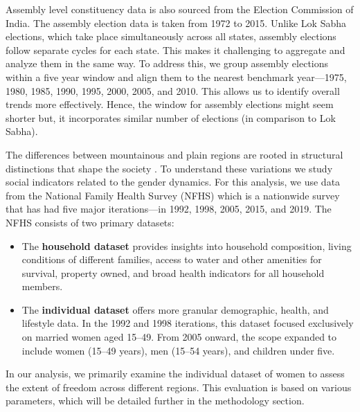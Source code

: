 \vspace{0.3cm}

Assembly level constituency data is also sourced from the Election Commission of India. The assembly election data is taken from 1972 to 2015. Unlike Lok Sabha elections, which take place simultaneously across all states, assembly elections follow separate cycles for each state. This makes it challenging to aggregate and analyze them in the same way. To address this, we group assembly elections within a five year window and align them to the nearest benchmark year—1975, 1980, 1985, 1990, 1995, 2000, 2005, and 2010. This allows us to identify overall trends more effectively. Hence, the window for assembly elections might seem shorter but, it incorporates similar number of elections (in comparison to Lok Sabha).

\vspace{0.3 cm}
\begin{sloppypar}

The differences between mountainous and plain regions  are rooted in  structural distinctions that shape the society \citep{jamesscott}. To  understand these variations we study social indicators related to the gender dynamics. For this analysis, we use data from the National Family Health Survey (NFHS) which is a  nationwide survey that has had five major iterations—in 1992, 1998, 2005, 2015, and 2019. The NFHS consists of two primary datasets: 
\end{sloppypar}
\begin{itemize}
    \item The \textbf{household dataset} provides insights into household composition, living conditions of different families, access to water and other amenities for survival, property owned, and broad health indicators for all household members.
\item The \textbf{individual dataset} offers more granular demographic, health, and lifestyle data. In the 1992 and 1998 iterations, this dataset focused exclusively on married women aged 15–49. From 2005 onward, the scope expanded to include women (15–49 years), men (15–54 years), and children under five.
\end{itemize}

In our analysis, we primarily examine the individual dataset of women to assess the extent of freedom across different regions. This evaluation is based on various parameters, which will be detailed further in the methodology section.

\vspace{0.3 cm}

